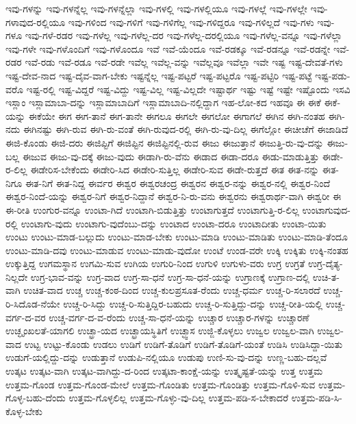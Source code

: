 {ಇವು-ಗಳನ್ನು
ಇವು-ಗಳನ್ನೆಲ್ಲ
ಇವು-ಗಳನ್ನೆಲ್ಲಾ
ಇವು-ಗಳಲ್ಲಿ
ಇವು-ಗಳಲ್ಲಿಯೂ
ಇವು-ಗಳಲ್ಲೆ
ಇವು-ಗಳಲ್ಲೇ
ಇವು-ಗಳಾವುದ-ರಲ್ಲಿಯೂ
ಇವು-ಗಳಿಂದ
ಇವು-ಗಳಿಗೆ
ಇವು-ಗಳಿಗೆಲ್ಲ
ಇವು-ಗಳಿದ್ದರೂ
ಇವು-ಗಳಿಲ್ಲದೆ
ಇವು-ಗಳು
ಇವು-ಗಳೂ
ಇವು-ಗಳೆ-ರಡರ
ಇವು-ಗಳೆಲ್ಲ
ಇವು-ಗಳೆಲ್ಲ-ದರ
ಇವು-ಗಳೆಲ್ಲ-ದರಲ್ಲಿಯೂ
ಇವು-ಗಳೆಲ್ಲ-ವನ್ನೂ
ಇವು-ಗಳೆಲ್ಲಾ
ಇವು-ಗಳೇ
ಇವು-ಗಳೊಂದಿಗೆ
ಇವು-ಗಳೊಂದೂ
ಇವೆ
ಇವೆ-ಯೆಂದೂ
ಇವೆ-ರಡಕ್ಕೂ
ಇವೆ-ರಡನ್ನೂ
ಇವೆ-ರಡನ್ನೇ
ಇವೆ-ರಡರ
ಇವೆ-ರಡು
ಇವೆ-ರಡೂ
ಇವೆ-ರಡೇ
ಇವೆಲ್ಲ
ಇವೆಲ್ಲ-ವನ್ನು
ಇವೆಲ್ಲವೂ
ಇವೆಲ್ಲಾ
ಇವೇ
ಇಷ್ಟ
ಇಷ್ಟ-ದೇವತೆ-ಗಳು
ಇಷ್ಟ-ದೇವ-ನಾದ
ಇಷ್ಟ-ದೈವ-ವಾಗ-ಬೇಕು
ಇಷ್ಟನ್ನೆಲ್ಲ
ಇಷ್ಟ-ಪಟ್ಟರೆ
ಇಷ್ಟ-ಪಟ್ಟರೊ
ಇಷ್ಟ-ಪಟ್ಟಿರಿ
ಇಷ್ಟ-ಪಟ್ಟೆ
ಇಷ್ಟ-ಪಡು-ವರೊ
ಇಷ್ಟ-ರಲ್ಲಿ
ಇಷ್ಟ-ವಿದ್ದರೆ
ಇಷ್ಟ-ವಿದ್ದು
ಇಷ್ಟ-ವಿಲ್ಲ
ಇಷ್ಟ-ವಿಲ್ಲದೇ
ಇಷ್ಟಾರ್ಥ
ಇಷ್ಟು
ಇಷ್ಟೆ
ಇಷ್ಟೇ
ಇಷ್ಟೊಂದು
ಇಸವಿ
ಇಸ್ಲಾಂ
ಇಸ್ಲಾಮಾಬಾ-ದನ್ನು
ಇಸ್ಲಾಮಾಬಾದಿಗೆ
ಇಸ್ಲಾಮಾಬಾದಿ-ನಲ್ಲಿದ್ದಾಗ
ಇಹ-ಲೋ-ಕದ
ಇಹವೂ
ಈ
ಈಕೆ
ಈಕೆ-ಯನ್ನು
ಈಕೆಯೇ
ಈಗ
ಈಗ-ತಾನೆ
ಈಗ-ತಾನೇ
ಈಗಲೂ
ಈಗಲೇ
ಈಗಲೋ
ಈಗಾಗಲೆ
ಈಗಿನ
ಈಗಿ-ನಂತಹ
ಈಗಿ-ನದು
ಈಗಿನಷ್ಟು
ಈಗಿ-ರುವ
ಈಗಿ-ರು-ವಂತೆ
ಈಗಿ-ರುವುದ-ರಲ್ಲಿ
ಈಗಿ-ರು-ವು-ದಿಲ್ಲ
ಈಗೆಲ್ಲೋ
ಈಚೀಚೆಗೆ
ಈಜಾಡಿದೆ
ಈಜಿ-ಕೊಂಡು
ಈಜಿ-ದರು
ಈಜಿಪ್ಟಿಗೆ
ಈಜಿಪ್ಟಿನ
ಈಜಿಪ್ಟಿನಲ್ಲಿ-ರುವ
ಈಜು
ಈಜುತ್ತಾನೆ
ಈಜುತ್ತಿ-ರು-ವು-ದನ್ನು
ಈಜು-ಬಲ್ಲ
ಈಜುವ
ಈಜು-ವು-ದಕ್ಕೆ
ಈಜು-ವುದು
ಈಡಾಗಿ-ರು-ವೆನು
ಈಡಾದ
ಈಡಾ-ದರೂ
ಈಡು-ಮಾಡುತ್ತಿತ್ತು
ಈಡೇ-ರ-ಲಿಲ್ಲ
ಈಡೇರಿಸ-ಬೇಕೆಂದು
ಈಡೇರಿ-ಸಿದ
ಈಡೇರಿ-ಸುತ್ತಿಲ್ಲ
ಈಡೇರಿ-ಸುವ
ಈಡೇ-ರುತ್ತದೆ
ಈತ
ಈತ-ನನ್ನು
ಈತ-ನಿಗೂ
ಈತ-ನಿಗೆ
ಈತ-ನಿದ್ದ
ಈರ್ವರ
ಈಶ್ವರ
ಈಶ್ವರಚಂದ್ರ
ಈಶ್ವರನ
ಈಶ್ವರ-ನನ್ನು
ಈಶ್ವರ-ನಲ್ಲಿ
ಈಶ್ವರ-ನಿಂದೆ
ಈಶ್ವರ-ನಿಂದೆ-ಯನ್ನು
ಈಶ್ವರ-ನಿಗೆ
ಈಶ್ವರ-ನಿದ್ದಾನೆ
ಈಶ್ವರ-ನಿ-ರು-ವನು
ಈಶ್ವರನು
ಈಶ್ವರಾರ್ಥ-ವಾಗಿ
ಈಶ್ವರೀ
ಈ
ಈ-ರೀತಿ
ಉಂಗುರ-ವನ್ನೂ
ಉಂಟಾ-ಗಿದೆ
ಉಂಟಾಗಿ-ಬಿಡುತ್ತಿತ್ತು
ಉಂಟಾಗುತ್ತದೆ
ಉಂಟಾಗುತ್ತಿ-ರ-ಲಿಲ್ಲ
ಉಂಟಾಗುವುದ-ರಲ್ಲಿ
ಉಂಟಾಗು-ವುದು
ಉಂಟಾಗು-ವುದೆಂಬು-ದನ್ನು
ಉಂಟಾದ
ಉಂಟಾ-ದರೂ
ಉಂಟಾದೀತು
ಉಂಟಾ-ಯಿತು
ಉಂಟು
ಉಂಟು-ಮಾಡ-ಬಲ್ಲುದು
ಉಂಟು-ಮಾಡ-ಬೇಕು
ಉಂಟು-ಮಾಡಿ
ಉಂಟು-ಮಾಡಿತು
ಉಂಟು-ಮಾಡಿ-ತೆಂದೂ
ಉಂಟು-ಮಾಡಿ-ದವು
ಉಂಟು-ಮಾಡುವ
ಉಂಟು-ಮಾಡು-ವುದೋ
ಉಂಟೆ
ಉಂಡ-ವರೇ
ಉಕ್ಕಿ
ಉಕ್ಕಿತು
ಉಕ್ಕಿ-ನಂತಹ
ಉಕ್ಕುತ್ತಿದ್ದ
ಉಗಮಸ್ಥಾನ
ಉಗಮಿ-ಸುವ
ಉಗಿಯ
ಉಗುರಿ-ನಿಂದ
ಉಗುಳಿ
ಉಗುಳು-ವರು
ಉಗ್ರ
ಉಗ್ರತೆ
ಉಗ್ರ-ದೈತ್ಯ-ನಿಲ್ಲದೇ
ಉಗ್ರ-ಭಾವ-ವನ್ನು
ಉಗ್ರ-ವಾದ
ಉಗ್ರ-ಸಾ-ಧನೆ
ಉಗ್ರ-ಸಾ-ಧನೆ-ಯನ್ನು
ಉಗ್ರಾಣಕ್ಕೆ
ಉಗ್ರಾಣ-ದಲ್ಲಿ
ಉಚಿ-ತ-ವಾಗಿ
ಉಚಿತ-ವಾದ
ಉಚ್ಚ
ಉಚ್ಚ-ಕಂಠ-ದಿಂದ
ಉಚ್ಚ-ಕುಲಪ್ರಸೂತ-ರೆಂದು
ಉಚ್ಚ-ಧರ್ಮ
ಉಚ್ಚ-ರಿ-ಸಲಾರದೆ
ಉಚ್ಚ-ರಿ-ಸಿದೊಡ-ನೆಯೇ
ಉಚ್ಚ-ರಿ-ಸಿದ್ದು
ಉಚ್ಚ-ರಿ-ಸುತ್ತಿದ್ದಿರ-ಬಹುದು
ಉಚ್ಚ-ರಿ-ಸುತ್ತಿದ್ದು-ದನ್ನು
ಉಚ್ಚ-ರೀತಿ-ಯಲ್ಲಿ
ಉಚ್ಚ-ವರ್ಗ-ದ-ವರ
ಉಚ್ಚ-ವರ್ಗ-ದ-ವ-ರೆಂದು
ಉಚ್ಚ-ಸಾ-ಧನೆ-ಯನ್ನು
ಉಚ್ಚಾರ
ಉಚ್ಚಾರ-ಗಳನ್ನು
ಉಚ್ಚಾರಣೆ
ಉಚ್ಛೃಂಖಲತೆ-ಯಾಗಲಿ
ಉಚ್ಛ್ರಾ-ಯದ
ಉಚ್ಛ್ರಾಯಸ್ಥಿತಿಗೆ
ಉಚ್ಛ್ವಾಸ
ಉಜ್ಜಿ-ಕೊಳ್ಳಲು
ಉಜ್ವಲ
ಉಜ್ವಲ-ವಾಗಿ
ಉಜ್ವಲ-ವಾದ
ಉಟ್ಟ
ಉಟ್ಟು-ಕೊಂಡು
ಉಡಲು
ಉಡಿಗೆ
ಉಡಿಗೆ-ತೊಡಿಗೆ
ಉಡಿಗೆ-ತೊಡಿಗೆ-ಯಂತೆ
ಉಡಿಸಿ
ಉಡಿಸಿದ್ದಾ-ಯಿತು
ಉಡುಗೆ-ಯಲ್ಲಿದ್ದು-ದನ್ನು
ಉಡುತ್ತಾನೆ
ಉಡುಪಿ-ನಲ್ಲಿಯೂ
ಉಡುಪು
ಉಣಿ-ಸು-ವು-ದನ್ನು
ಉಣ್ಣ-ಬಹು-ದಲ್ಲವೆ
ಉತ್ಕಟ
ಉತ್ಕಟ-ವಾಗಿ
ಉತ್ಕಟ-ವಾಗಿದ್ದು-ದ-ರಿಂದ
ಉತ್ಕಟಾ-ಕಾಂಕ್ಷೆ-ಯನ್ನು
ಉತ್ಕೃಷ್ಟತೆ-ಯನ್ನು
ಉತ್ತ
ಉತ್ತಮ
ಉತ್ತಮ-ಗೊಂಡ
ಉತ್ತಮ-ಗೊಂಡ-ಮೇಲೆ
ಉತ್ತಮ-ಗೊಂಡಿತು
ಉತ್ತಮ-ಗೊಂಡಿತ್ತು
ಉತ್ತಮ-ಗೊಳಿ-ಸುವ
ಉತ್ತಮ-ಗೊಳ್ಳ-ಬಹು-ದೆಂದು
ಉತ್ತಮ-ಗೊಳ್ಳಲಿಲ್ಲ
ಉತ್ತಮ-ಗೊಳ್ಳು-ವು-ದಿಲ್ಲ
ಉತ್ತಮ-ಪಡಿ-ಸ-ಬೇಕಾದರೆ
ಉತ್ತಮ-ಪಡಿ-ಸಿ-ಕೊಳ್ಳ-ಬೇಕು
}
